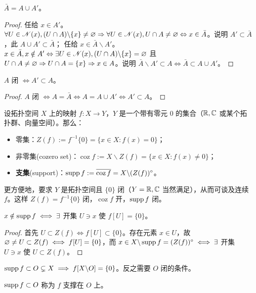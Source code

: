 \begin{theorem}
    $\bar A=A\cup A'$。  
\end{theorem}

\begin{proof}
    任给 $x\in A'$。$\forall U\in\mathscr N(x),(U\cap A)\backslash\{x\}\ne\varnothing\Rightarrow \forall U\in\mathscr N(x),U\cap A\ne\varnothing\Leftrightarrow x\in\bar A$。说明 $A'\subset \bar A$，此 $A\cup A'\subset\bar A$；
    任给 $x\in\bar A\backslash A'$。$x\in\bar A,x\notin A'\Leftrightarrow \exists U\in\mathscr N(x),(U\cap A)\backslash\{x\}=\varnothing$ 且 $U\cap A\ne\varnothing\Rightarrow U\cap A=\{x\}\Rightarrow x\in A$。说明 $\bar A\backslash A'\subset A\iff \bar A\subset A\cup A'$。
\end{proof}

\begin{theorem}
    $A$ 闭 $\iff A'\subset A$。
\end{theorem}
\begin{proof}
    $A$ 闭 $\iff A=\bar A\iff A=A\cup A'\iff A'\subset A$。
\end{proof}

\begin{definition}
    设拓扑空间 $X$ 上的映射 $f: X \to Y$，$Y$ 是一个带有零元 $0$ 的集合（$\mathbb{R},\mathbb{C}$ 或某个拓扑群、向量空间）。那么：
    \begin{itemize}
        \item 零集：$Z(f):=f^{-1}\{0\}=\{x\in X: f(x)=0\}$；
        \item 非零集(cozero set)：$\operatorname{coz}f:=X\backslash Z(f)=\{x\in X: f(x)\ne 0\}$；
        \item \textbf{支集}(support)：$\operatorname{supp} f:=\overline{\operatorname{coz}f}
  = X\backslash (Z(f))^\circ$。
    \end{itemize}
    更方便地，要求 $Y$ 是拓扑空间且 $\{0\}$ 闭（$Y=\mathbb{R},\mathbb{C}$ 当然满足），从而可谈及连续 $f$。这样 $Z(f)=f^{-1}\{0\}$ 闭，$\operatorname{coz} f$ 开，$\operatorname{supp} f$ 闭。
\end{definition}

\begin{theorem}
     $x\notin \operatorname{supp} f\iff\exists$ 开集 $U\ni x$ 使 $f[U]=\{0\}$。
\end{theorem}
\begin{proof}
    首先 $U\subset Z(f)\iff f[U] \subset \{0\}$。存在元素 $x\in U$，故 $\varnothing\ne U\subset Z(f)\iff f[U]=\{0\}$，而 $x\in X\backslash\operatorname{supp} f = (Z(f))^\circ \iff \exists$ 开集 $U\ni x$ 使 $U\subset Z(f)$。
\end{proof}
\begin{theorem}
    $\operatorname{supp} f \subset O\subsetneq X\implies f[X\backslash O]=\{0\}$。反之需要 $O$ 闭的条件。
\end{theorem}
\begin{remark}
    $\operatorname{supp} f \subset O$ 称为 $f$ 支撑在 $O$ 上。
\end{remark}


